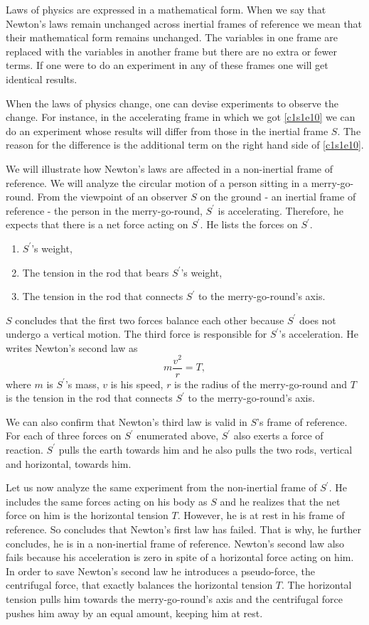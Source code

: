 Laws of physics are expressed in a mathematical form. When we say that Newton's
laws remain unchanged across inertial frames of reference we mean that their
mathematical form remains unchanged. The variables in one frame are replaced
with the variables in another frame but there are no extra or fewer terms. If
one were to do an experiment in any of these frames one will get identical
results.

When the laws of physics change, one can devise experiments to observe the 
change. For instance, in the accelerating frame in which we got \eqref{c1s1e10}
we can do an experiment whose results will differ from those in the inertial
frame $S$. The reason for the difference is the additional term on the right
hand side of \eqref{c1s1e10}.

We will illustrate how Newton's laws are affected in a non-inertial frame
of reference. We will analyze the circular motion of a person sitting in a 
merry-go-round. From the viewpoint of an observer $S$ on the ground - an 
inertial frame of reference - the person in the merry-go-round, $S^\prime$ is 
accelerating. Therefore, he expects that there is a net force acting on 
$S^\prime$. He lists the forces on $S^\prime$.
\begin{enumerate}
\item $S^\prime$'s weight,
\item The tension in the rod that bears $S^\prime$'s weight,
\item The tension in the rod that connects $S^\prime$ to the merry-go-round's
axis.
\end{enumerate}
$S$ concludes that the first two forces balance each other because $S^\prime$
does not undergo a vertical motion. The third force is responsible for 
$S^\prime$'s acceleration. He writes Newton's second law as
\begin{equation}\label{c1s1e11}
m\frac{v^2}{r} = T,
\end{equation}
where $m$ is $S^\prime$'s mass, $v$ is his speed, $r$ is the radius of the
merry-go-round and $T$ is the tension in the rod that connects $S^\prime$ to
the merry-go-round's axis.

We can also confirm that Newton's third law is valid in $S$'s frame of 
reference. For each of three forces on $S^\prime$ enumerated above, $S^\prime$
also exerts a force of reaction. $S^\prime$ pulls the earth towards him and he
also pulls the two rods, vertical and horizontal, towards him.

Let us now analyze the same experiment from the non-inertial frame of 
$S^\prime$. He includes the same forces acting on his body as $S$ and he
realizes that the net force on him is the horizontal tension $T$. However, he 
is at rest in his frame of reference. So concludes that Newton's first law has
failed. That is why, he further concludes, he is in a non-inertial frame of
reference. Newton's second law also fails because his acceleration is zero
in spite of a horizontal force acting on him. In order to save Newton's second
law he introduces a pseudo-force, the centrifugal force, that exactly balances
the horizontal tension $T$. The horizontal tension pulls him towards the
merry-go-round's axis and the centrifugal force pushes him away by an equal
amount, keeping him at rest.

